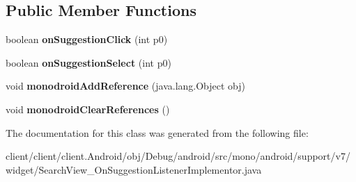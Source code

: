 \subsection*{Public Member Functions}
\begin{DoxyCompactItemize}
\item 
\hypertarget{classmono_1_1android_1_1support_1_1v7_1_1widget_1_1SearchView__OnSuggestionListenerImplementor_adf271189585405221f4ec0056022b836}{}boolean {\bfseries on\+Suggestion\+Click} (int p0)\label{classmono_1_1android_1_1support_1_1v7_1_1widget_1_1SearchView__OnSuggestionListenerImplementor_adf271189585405221f4ec0056022b836}

\item 
\hypertarget{classmono_1_1android_1_1support_1_1v7_1_1widget_1_1SearchView__OnSuggestionListenerImplementor_aedc377e3efa764d9a340e4fb489d95e7}{}boolean {\bfseries on\+Suggestion\+Select} (int p0)\label{classmono_1_1android_1_1support_1_1v7_1_1widget_1_1SearchView__OnSuggestionListenerImplementor_aedc377e3efa764d9a340e4fb489d95e7}

\item 
\hypertarget{classmono_1_1android_1_1support_1_1v7_1_1widget_1_1SearchView__OnSuggestionListenerImplementor_a2b53b8bc0b5b5ea851eaf812bf3f33c1}{}void {\bfseries monodroid\+Add\+Reference} (java.\+lang.\+Object obj)\label{classmono_1_1android_1_1support_1_1v7_1_1widget_1_1SearchView__OnSuggestionListenerImplementor_a2b53b8bc0b5b5ea851eaf812bf3f33c1}

\item 
\hypertarget{classmono_1_1android_1_1support_1_1v7_1_1widget_1_1SearchView__OnSuggestionListenerImplementor_a18c038c967faebaff57c907d5d3d920b}{}void {\bfseries monodroid\+Clear\+References} ()\label{classmono_1_1android_1_1support_1_1v7_1_1widget_1_1SearchView__OnSuggestionListenerImplementor_a18c038c967faebaff57c907d5d3d920b}

\end{DoxyCompactItemize}


The documentation for this class was generated from the following file\+:\begin{DoxyCompactItemize}
\item 
client/client/client.\+Android/obj/\+Debug/android/src/mono/android/support/v7/widget/Search\+View\+\_\+\+On\+Suggestion\+Listener\+Implementor.\+java\end{DoxyCompactItemize}
